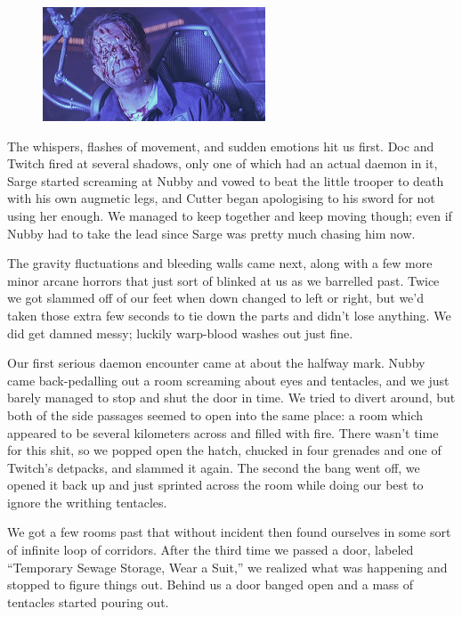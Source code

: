 \begin{figure}
	\begin{center}
		\includegraphics[width=\figwidth]{pics/7/33.png}
	\end{center}
\end{figure}
The whispers, flashes of movement, and sudden emotions hit us first. 
Doc and Twitch fired at several shadows, only one of which had an actual daemon in it, Sarge started screaming at Nubby and vowed to beat the little trooper to death with his own augmetic legs, and Cutter began apologising to his sword for not using her enough. 
We managed to keep together and keep moving though; 
even if Nubby had to take the lead since Sarge was pretty much chasing him now.

The gravity fluctuations and bleeding walls came next, along with a few more minor arcane horrors that just sort of blinked at us as we barrelled past. 
Twice we got slammed off of our feet when down changed to left or right, but we’d taken those extra few seconds to tie down the parts and didn’t lose anything. 
We did get damned messy; 
luckily warp-blood washes out just fine.

Our first serious daemon encounter came at about the halfway mark. 
Nubby came back-pedalling out a room screaming about eyes and tentacles, and we just barely managed to stop and shut the door in time. 
We tried to divert around, but both of the side passages seemed to open into the same place: 
a room which appeared to be several kilometers across and filled with fire. 
There wasn’t time for this shit, so we popped open the hatch, chucked in four grenades and one of Twitch’s detpacks, and slammed it again. 
The second the bang went off, we opened it back up and just sprinted across the room while doing our best to ignore the writhing tentacles.

We got a few rooms past that without incident then found ourselves in some sort of infinite loop of corridors. 
After the third time we passed a door, labeled “Temporary Sewage Storage, Wear a Suit,” we realized what was happening and stopped to figure things out. 
Behind us a door banged open and a mass of tentacles started pouring out.

